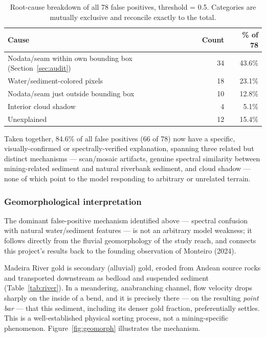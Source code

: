 \documentclass[11pt,a4paper]{article}
\begin{document}
\begin{table}[htbp]
\centering
\caption{Root-cause breakdown of all 78 false positives, threshold = 0.5.
Categories are mutually exclusive and reconcile exactly to the total.}
\label{tab:fpcauses}
\begin{tabular}{lrr}
\toprule
\textbf{Cause} & \textbf{Count} & \textbf{\% of 78} \\
\midrule
Nodata/seam within own bounding box (Section~\ref{sec:audit}) & 34 & 43.6\% \\
Water/sediment-colored pixels & 18 & 23.1\% \\
Nodata/seam just outside bounding box & 10 & 12.8\% \\
Interior cloud shadow & 4 & 5.1\% \\
Unexplained & 12 & 15.4\% \\
\bottomrule
\end{tabular}
\end{table}

Taken together, 84.6\% of all false positives (66 of 78) now have a
specific, visually-confirmed or spectrally-verified explanation, spanning
three related but distinct mechanisms --- scan/mosaic artifacts, genuine
spectral similarity between mining-related sediment and natural riverbank
sediment, and cloud shadow --- none of which point to the model responding
to arbitrary or unrelated terrain.

\subsubsection{Geomorphological interpretation}
\label{sec:geomorph}
The dominant false-positive mechanism identified above --- spectral
confusion with natural water/sediment features --- is not an arbitrary
model weakness; it follows directly from the fluvial geomorphology of the
study reach, and connects this project's results back to the founding
observation of Monteiro (2024).

Madeira River gold is secondary (alluvial) gold, eroded from Andean source
rocks and transported downstream as bedload and suspended sediment
(Table~\ref{tab:river}). In a meandering, anabranching channel, flow
velocity drops sharply on the inside of a bend, and it is precisely there
--- on the resulting \emph{point bar} --- that this sediment, including
its denser gold fraction, preferentially settles. This is a well-established
physical sorting process, not a mining-specific phenomenon.
Figure~\ref{fig:geomorph} illustrates the mechanism.
\end{document}
